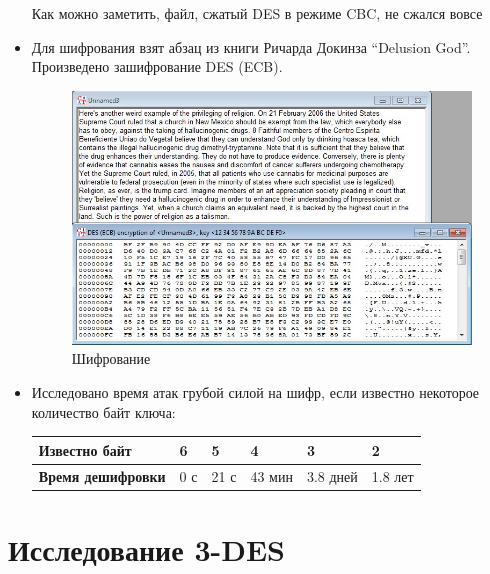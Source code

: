\documentclass[a4paper, 14pt]{extarticle}
\begin{document}
\begin{itemize}
    Как можно заметить, файл, сжатый DES в режиме CBC, не сжался вовсе

    \item Для шифрования взят абзац из книги Ричарда Докинза ``Delusion God''. Произведено зашифрование DES (ECB).
    \begin{figure}[h]
        \centering
        \includegraphics[width=\textwidth]{./img/S010.jpg}
        \caption{Шифрование }%
        \label{img:2:6}
    \end{figure}
    \item Исследовано время атак грубой силой на шифр, если известно некоторое количество байт ключа:
    \begin{table}[h]
        \centering
        \begin{tabular}{@{}llllll@{}}
        \toprule
        \textbf{Известно  байт} & 6 & 5 & 4 & 3 & 2 \\ \midrule
        \textbf{Время дешифровки} & 0 с & 21 с & 43 мин & 3.8 дней & 1.8 лет \\ \bottomrule
        \end{tabular}
    \end{table}

\end{itemize}

\FloatBarrier{}
\section{Исследование 3-DES}
\end{document}
